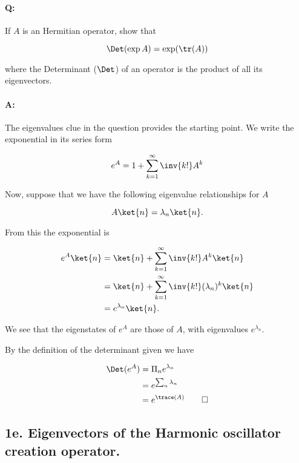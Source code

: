 \paragraph{Q:} If $A$ is an Hermitian operator, show that

\begin{equation}\label{eqn:qmIexamPractice2008Dec:1d:10}
\Det( \exp A ) = \exp ( \tr(A) )
\end{equation}

where the Determinant ($\Det$) of an operator is the product of all its eigenvectors.

\paragraph{A:}

The eigenvalues clue in the question provides the starting point.  We write the exponential in its series form

\begin{equation}\label{eqn:qmIexamPractice2008Dec:1d:20}
e^A = 1 + \sum_{k=1}^\infty \inv{k!} A^k
\end{equation}

Now, suppose that we have the following eigenvalue relationships for $A$

\begin{equation}\label{eqn:qmIexamPractice2008Dec:1d:30}
A \ket{n} = \lambda_n \ket{n}.
\end{equation}

From this the exponential is

\begin{align*}
e^A \ket{n} 
&= \ket{n} + \sum_{k=1}^\infty \inv{k!} A^k \ket{n} \\
&= \ket{n} + \sum_{k=1}^\infty \inv{k!} (\lambda_n)^k \ket{n} \\
&= e^{\lambda_n} \ket{n}.
\end{align*}

We see that the eigenstates of $e^A$ are those of $A$, with eigenvalues $e^{\lambda_n}$.

By the definition of the determinant given we have

\begin{align*}
\Det( e^A ) 
&= \Pi_n e^{\lambda_n} \\
&= e^{\sum_n \lambda_n} \\
&= e^{\trace(A)} \qquad \square
\end{align*}

\subsection{1e.  Eigenvectors of the Harmonic oscillator creation operator.}

